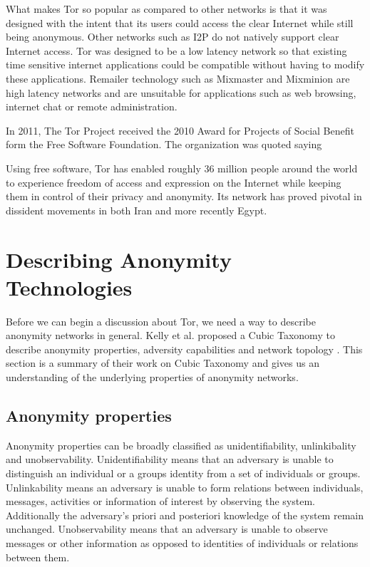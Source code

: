 \documentclass{llncs}
\begin{document}
What makes Tor so popular as compared to other networks is that it was designed with the intent that its users could access the clear Internet while still being anonymous. Other networks such as I2P do not natively support clear Internet access. Tor was designed to be a low latency network so that existing time sensitive internet applications could be compatible without having to modify these applications. Remailer technology such as Mixmaster and Mixminion are high latency networks and are unsuitable for applications such as web browsing, internet chat or remote administration.

In 2011, The Tor Project received the 2010 Award for Projects of Social Benefit form the Free Software Foundation. The organization was quoted saying
\begin{displayquote}
Using free software, Tor has enabled roughly 36 million people around the world to experience freedom of access and expression on the Internet while keeping them in control of their privacy and anonymity. Its network has proved pivotal in dissident movements in both Iran and more recently Egypt.\cite{free-software-foundation}
\end{displayquote}

\section{Describing Anonymity Technologies} \label{taxonomy}
Before we can begin a discussion about Tor,  we need a way to describe anonymity networks in general. Kelly et al. proposed a Cubic Taxonomy to describe anonymity properties, adversity capabilities and network topology \cite{kelly2012exploring}. This section is a summary of their work on Cubic Taxonomy and gives us an understanding of the underlying properties of anonymity networks.

\subsection{Anonymity properties}
Anonymity properties can be broadly classified as unidentifiability, unlinkibality and unobservability. Unidentifiability means that an adversary is unable to distinguish an individual or a groups identity from a set of individuals or groups. Unlinkability means an adversary is unable to form relations between individuals, messages, activities or information of interest by observing the system. Additionally the adversary's priori and posteriori knowledge of the system remain unchanged. Unobservability means that an adversary is unable to observe messages or other information as opposed to identities of individuals or relations between them.
\end{document}
